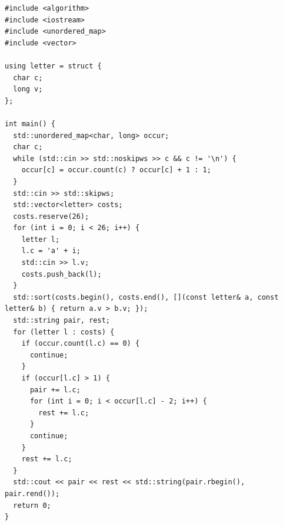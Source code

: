 \begin{lstlisting}
#include <algorithm>
#include <iostream>
#include <unordered_map>
#include <vector>

using letter = struct {
  char c;
  long v;
};

int main() {
  std::unordered_map<char, long> occur;
  char c;
  while (std::cin >> std::noskipws >> c && c != '\n') {
    occur[c] = occur.count(c) ? occur[c] + 1 : 1;
  }
  std::cin >> std::skipws;
  std::vector<letter> costs;
  costs.reserve(26);
  for (int i = 0; i < 26; i++) {
    letter l;
    l.c = 'a' + i;
    std::cin >> l.v;
    costs.push_back(l);
  }
  std::sort(costs.begin(), costs.end(), [](const letter& a, const letter& b) { return a.v > b.v; });
  std::string pair, rest;
  for (letter l : costs) {
    if (occur.count(l.c) == 0) {
      continue;
    }
    if (occur[l.c] > 1) {
      pair += l.c;
      for (int i = 0; i < occur[l.c] - 2; i++) {
        rest += l.c;
      }
      continue;
    }
    rest += l.c;
  }
  std::cout << pair << rest << std::string(pair.rbegin(), pair.rend());
  return 0;
}
\end{lstlisting}